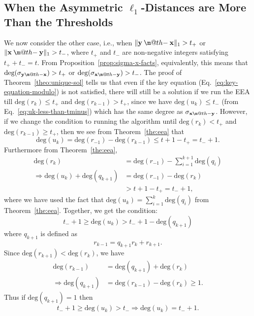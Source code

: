 \documentclass[pdflatex,sn-mathphys-num]{sn-jnl}
\makeatletter
\newcommand{\dotdiv}{\mathbin{\text{\@dotdiv}}}
\newcommand{\@dotdiv}{%
  \ooalign{\hidewidth\raise1ex\hbox{.}\hidewidth\cr$\m@th-$\cr}%
}
\theoremstyle{definition}
\newcommand{\vtr}[1]{\mathbf{#1}}
\newcommand{\norm}[1]{\lVert{#1}\rVert}
\makeatother
\begin{document}
\subsection{\texorpdfstring{When the Asymmetric $\ell_1$-Distances are More Than the Thresholds}{When the Asymmetric l1-Distance is More Than the Threshold}}
\label{subsec:l1-more-than-t}
We now consider the other case, i.e., when $\norm{\vtr{y} \dotdiv \vtr{x}}_1 > t_+ $ or $\norm{\vtr{x} \dotdiv \vtr{y}}_1 > t_-$, where $t_+$ and $t_-$ are non-negative integers satisfying $t_+ + t_- = t$. From Proposition~\ref{prop:sigma-x-facts}, equivalently, this means that 
$\text{deg}(\sigma_{\vtr{y} \dotdiv \vtr{x}}) > t_+$
 or $\text{deg}(\sigma_{\vtr{x} \dotdiv \vtr{y}}) > t_-$. The proof of Theorem~\ref{theo:unique-sol} tells us that even if the key equation (Eq.~\eqref{eq:key-equation-modulo}) is not satisfied, there will still be a solution if we run the EEA till $\text{deg}(r_k) \leq t_{+}$ and $\text{deg}(r_{k-1}) > t_{+}$, since we have $\text{deg}(u_k) \leq t_{-}$ (from Eq.~\eqref{eq:uk-less-than-tminus}) which has the same degree as $\sigma_{\vtr{x} \dotdiv \vtr{y}}$. However, if we change the condition to running the algorithm until $\text{deg}(r_k) < t_+$ and $\text{deg}(r_{k-1}) \geq t_{+}$, then we see from Theorem~\ref{the:eea} that
\[
\text{deg}(u_k) = \text{deg}(r_{-1}) - \text{deg}(r_{k-1}) \leq t + 1 - t_{+} = t_{-} + 1.
\]
Furthermore from Theorem~\ref{the:eea}, 
\begin{align*}
   \text{deg}(r_k) &= \text{deg}(r_{-1}) - \sum_{i = 1}^{k+1} \text{deg}(q_{i}) \\
    \Rightarrow \text{deg}(u_k) + \text{deg}(q_{k+1}) &= \text{deg}(r_{-1}) - \text{deg} (r_k) \\
    &> t + 1 - t_+ = t_- + 1,
\end{align*}
where we have used the fact that $\text{deg}(u_k) = \sum_{i = 1}^{k} \text{deg}(q_{i})$ from Theorem~\ref{the:eea}. Together, we get the condition:
\[
t_- + 1 \geq \text{deg}(u_k) > t_- + 1 - \text{deg}(q_{k+1})
\]
where $q_{k+1}$ is defined as
\[
r_{k-1} = q_{k+1} r_{k} + r_{k+1}.
\]
Since $\text{deg}(r_{k+1}) < \text{deg}(r_{k})$, we have
\begin{align*}
    \text{deg}(r_{k-1}) &= \text{deg}(q_{k+1}) + \text{deg}(r_{k}) \\
    \Rightarrow \text{deg}(q_{k+1}) &= \text{deg}(r_{k-1}) - \text{deg}(r_{k}) \geq 1.
\end{align*}
Thus if $ \text{deg}(q_{k+1}) = 1$ then 
\[
t_- + 1 \geq \text{deg}(u_k) > t_- \Rightarrow \text{deg}(u_k) = t_- + 1.
\]
\end{document}
